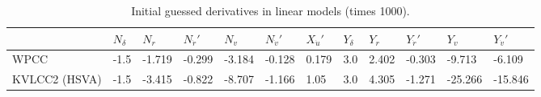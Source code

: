 \begin{table}[h]
    \scriptsize
    \caption{Initial guessed derivatives in linear models (times 1000).}
    \label{tab:initial}
    \begin{tabular*}{\textwidth}{p{0.9cm} l l l l l l l l l l l}
\toprule
 & 

\( N_{\delta} \)
& 

\( N_{r} \)
& 

\( N_{\dot{r}}' \)
& 

\( N_{v} \)
& 

\( N_{\dot{v}}' \)
& 

\( X_{\dot{u}}' \)
& 

\( Y_{\delta} \)
& 

\( Y_{r} \)
& 

\( Y_{\dot{r}}' \)
& 

\( Y_{v} \)
& 

\( Y_{\dot{v}}' \)
\\
\hline

WPCC
&

-1.5
&

-1.719
&

-0.299
&

-3.184
&

-0.128
&

0.179
&

3.0
&

2.402
&

-0.303
&

-9.713
&

-6.109
\\

KVLCC2 (HSVA)
&

-1.5
&

-3.415
&

-0.822
&

-8.707
&

-1.166
&

1.05
&

3.0
&

4.305
&

-1.271
&

-25.266
&

-15.846
\\
\bottomrule
\end{tabular*}

\end{table}

